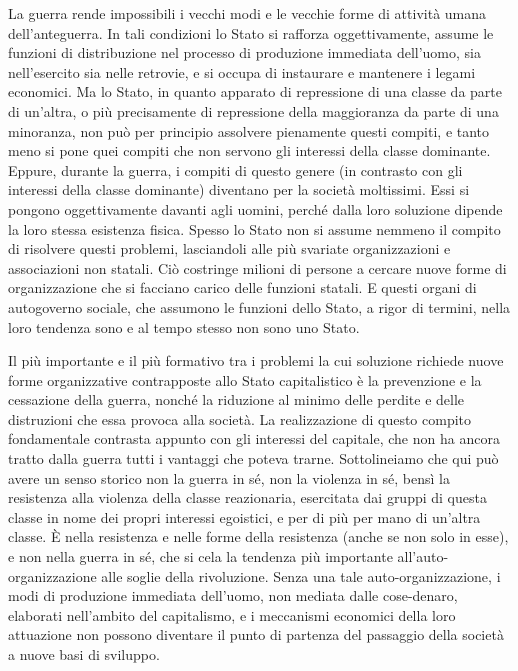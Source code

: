 \documentclass[../main]{subfiles}
\begin{document}
La guerra rende impossibili i vecchi modi e le vecchie forme di attività umana dell'anteguerra. In tali condizioni lo Stato si rafforza oggettivamente, assume le funzioni di distribuzione nel processo di produzione immediata dell'uomo, sia nell'esercito sia nelle retrovie, e si occupa di instaurare e mantenere i legami economici. Ma lo Stato, in quanto apparato di repressione di una classe da parte di un'altra, o più precisamente di repressione della maggioranza da parte di una minoranza, non può per principio assolvere pienamente questi compiti, e tanto meno si pone quei compiti che non servono gli interessi della classe dominante. Eppure, durante la guerra, i compiti di questo genere (in contrasto con gli interessi della classe dominante) diventano per la società moltissimi. Essi si pongono oggettivamente davanti agli uomini, perché dalla loro soluzione dipende la loro stessa esistenza fisica. Spesso lo Stato non si assume nemmeno il compito di risolvere questi problemi, lasciandoli alle più svariate organizzazioni e associazioni non statali. Ciò costringe milioni di persone a cercare nuove forme di organizzazione che si facciano carico delle funzioni statali. E questi organi di autogoverno sociale, che assumono le funzioni dello Stato, a rigor di termini, nella loro tendenza sono e al tempo stesso non sono uno Stato.

Il più importante e il più formativo tra i problemi la cui soluzione richiede nuove forme organizzative contrapposte allo Stato capitalistico è la prevenzione e la cessazione della guerra, nonché la riduzione al minimo delle perdite e delle distruzioni che essa provoca alla società. La realizzazione di questo compito fondamentale contrasta appunto con gli interessi del capitale, che non ha ancora tratto dalla guerra tutti i vantaggi che poteva trarne. Sottolineiamo che qui può avere un senso storico non la guerra in sé, non la violenza in sé, bensì la resistenza alla violenza della classe reazionaria, esercitata dai gruppi di questa classe in nome dei propri interessi egoistici, e per di più per mano di un'altra classe. È nella resistenza e nelle forme della resistenza (anche se non solo in esse), e non nella guerra in sé, che si cela la tendenza più importante all'auto-organizzazione alle soglie della rivoluzione. Senza una tale auto-organizzazione, i modi di produzione immediata dell'uomo, non mediata dalle cose-denaro, elaborati nell'ambito del capitalismo, e i meccanismi economici della loro attuazione non possono diventare il punto di partenza del passaggio della società a nuove basi di sviluppo.
\end{document}
